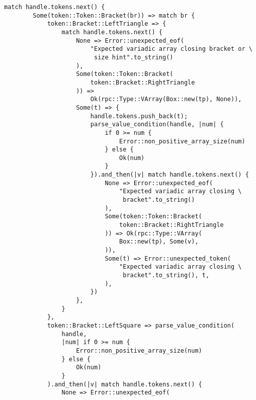 \begin{lstlisting}[caption={Разбор типа (часть 5)}, label={lst:rust_parser_type5}]
    match handle.tokens.next() {
        Some(token::Token::Bracket(br)) => match br {
            token::Bracket::LeftTriangle => {
                match handle.tokens.next() {
                    None => Error::unexpected_eof(
                        "Expected variadic array closing bracket or \
                         size hint".to_string()
                    ),
                    Some(token::Token::Bracket(
                        token::Bracket::RightTriangle
                    )) =>
                        Ok(rpc::Type::VArray(Box::new(tp), None)),
                    Some(t) => {
                        handle.tokens.push_back(t);
                        parse_value_condition(handle, |num| {
                            if 0 >= num {
                                Error::non_positive_array_size(num)
                            } else {
                                Ok(num)
                            }
                        }).and_then(|v| match handle.tokens.next() {
                            None => Error::unexpected_eof(
                                "Expected variadic array closing \
                                 bracket".to_string()
                            ),
                            Some(token::Token::Bracket(
                                token::Bracket::RightTriangle
                            )) => Ok(rpc::Type::VArray(
                                Box::new(tp), Some(v),
                            )),
                            Some(t) => Error::unexpected_token(
                                "Expected variadic array closing \
                                 bracket".to_string(), t,
                            ),
                        })
                    },
                }
            },
            token::Bracket::LeftSquare => parse_value_condition(
                handle,
                |num| if 0 >= num {
                    Error::non_positive_array_size(num)
                } else {
                    Ok(num)
                }
            ).and_then(|v| match handle.tokens.next() {
                None => Error::unexpected_eof(
\end{lstlisting}
\clearpage
